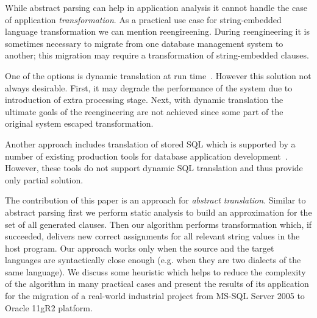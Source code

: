 While abstract parsing can help in application analysis it cannot handle the case of application
\emph{transformation}. As a practical use case for string-embedded language transformation we can mention
reengireening. During reengineering it is sometimes necessary to migrate from one database management 
system to another; this migration may require a transformation of string-embedded 
clauses. 

One of the options is dynamic translation at run time~\cite{OpenSystemsDBMS}. However this solution
not always desirable. First, it may degrade the performance of the system due to introduction of extra 
processing stage. Next, with dynamic translation the ultimate goals of the reengineering are not achieved 
since some part of the original system escaped transformation. 

Another approach includes translation of stored SQL which is supported by a number of existing production tools 
for database application development~\cite{PLSQL,SwissSQL,SQLWays}. However, these tools do not support 
dynamic SQL translation and thus provide only partial solution. 




The contribution of this paper is an approach for \emph{abstract translation}. 
Similar to abstract parsing first we perform static analysis to build an approximation for the set of all 
generated clauses. Then our algorithm performs transformation which, if succeeded, delivers new correct 
assignments for all relevant string values in the host program. Our approach works only when 
the source and the target languages are syntactically close enough (e.g. when they are two dialects of the same
language).  We discuss some heuristic which helps to reduce the complexity of the algorithm in many practical 
cases and present the results of its application for the migration of a real-world industrial project from 
MS-SQL Server 2005 to Oracle 11gR2 platform.


